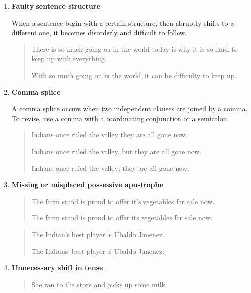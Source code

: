 \begin{enumerate}
\begin{quote}
\end{quote}

\item \textbf{Faulty sentence structure}

When a sentence begin with a certain structure, then abruptly shifts to a different
one, it becomes disorderly and difficult to follow. 

\begin{quote}
There is so much going on in the world today is why it is so hard to 
keep up with everything.

With so much going on in the world, it can be difficulty to keep up.

\end{quote}


\item \textbf{Comma splice}

A comma splice occurs when two independent clauses are joined by a comma. To
revise, use a comma with a coordinating conjunction or a semicolon.

\begin{quote}
Indians once ruled the valley they are all gone now. 

Indians once ruled the valley, but they are all gone now. 

Indians once ruled the valley; they are all gone now. 

\end{quote}

\item \textbf{Missing or misplaced possessive apostrophe}

\begin{quote}
The farm stand is proud to offer it's vegetables for sale now. 

The farm stand is proud to offer its vegetables for sale now. 
\end{quote}

\begin{quote}

The Indian's best player is Ubaldo Jimenez. 

The Indians' best player is Ubaldo Jimenez. 

\end{quote}


\item \textbf{Unnecessary shift in tense}.

\begin{quote}
She ran to the store and picks up some milk. 


\end{quote}
\end{enumerate}
